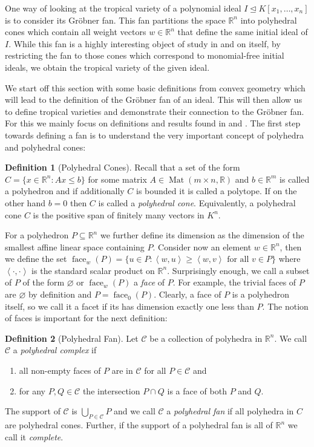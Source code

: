 \documentclass[
  paper=a4,
  DIV=14,
  fontsize=12pt,
  titlepage,
  bibliography=totoc,
  pagesize=pdftex
]{scrartcl}
\numberwithin{figure}{section}
\numberwithin{equation}{section}
\numberwithin{table}{section}
\newcommand*\setR{\mathds{R}}
\newcommand*\ideal[1]{\left\langle #1 \right\rangle}
\let\idealof\trianglelefteq
\DeclareMathOperator{\Mat}{Mat}
\DeclareMathOperator{\face}{face}
\theoremstyle{definition}
\newtheorem{definition}{Definition}
\numberwithin{definition}{section}
\begin{document}
One way of looking at the tropical variety of a polynomial ideal $I \idealof K[x_1, \dots,
x_n]$ is to consider its Gröbner fan. This fan partitions the space $\setR^n$ into
polyhedral cones which contain all weight vectors $w\in \setR^n$ that define the same
initial ideal of $I$. While this fan is a highly interesting object of study in and on
itself, by restricting the fan to those cones which correspond to monomial-free initial
ideals, we obtain the tropical variety of the given ideal.

We start off this section with some basic definitions from convex geometry which will lead
to the definition of the Gröbner fan of an ideal. This will then allow us to define
tropical varieties and demonstrate their connection to the Gröbner fan. For this we mainly
focus on definitions and results found in \cite{compGrobFan} and \cite{SturmGBCP}. The
first step towards defining a fan is to understand the very important concept of polyhedra
and polyhedral cones:

\begin{definition}[Polyhedral Cones]
  Recall that a set of the form $C = \{ x \in \setR^n : Ax \leq b \}$ for some matrix $A
  \in \Mat(m\times n, \setR)$ and $b \in \setR^m$ is called a polyhedron and if
  additionally $C$ is bounded it is called a polytope. If on the other hand $b=0$ then $C$
  is called a \emph{polyhedral cone}. Equivalently, a polyhedral cone $C$ is the positive
  span of finitely many vectors in $K^n$.
  \label{def:polyhedralCone}
\end{definition}

For a polyhedron $P \subseteq \setR^n$ we further define its dimension as the dimension of
the smallest affine linear space containing $P$. Consider now an element $w \in \setR^n$,
then we define the set $\face_w(P) = \{ u \in P : \ideal{w,u} \geq \ideal{w,v} \text{ for
all } v\in P\}$ where $\ideal{\cdot,\cdot}$ is the standard scalar product on $\setR^n$.
Surprisingly enough, we call a subset of $P$ of the form $\varnothing$ or $\face_w(P)$ a
\emph{face} of $P$. For example, the trivial faces of $P$ are $\varnothing$ by definition
and $P = \face_0(P)$. Clearly, a face of $P$ is a polyhedron itself, so we call it a facet
if its has dimension exactly one less than $P$. The notion of faces is important for the
next definition:

\begin{definition}[Polyhedral Fan]
  Let $\mathcal C$ be a collection of polyhedra in $\setR^n$. We call $\mathcal C$ a
  \emph{polyhedral complex} if
  \begin{enumerate}
    \item all non-empty faces of $P$ are in $\mathcal C$ for all $P \in \mathcal C$ and
    \item for any $P,Q \in \mathcal C$ the intersection $P\cap Q$ is a face of both $P$
      and $Q$.
  \end{enumerate}
  The support of $\mathcal C$ is $\bigcup_{P\in\mathcal C}P$ and we call $\mathcal C$ a
  \emph{polyhedral fan} if all polyhedra in $C$ are polyhedral cones. Further, if the
  support of a polyhedral fan is all of $\setR^n$ we call it \emph{complete}.
  \label{def:polyhedralFan}
\end{definition}
\end{document}

